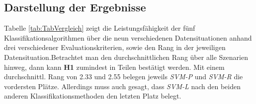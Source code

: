 \documentclass[
]{article}
\begin{document}
\subsection{Darstellung der Ergebnisse}

Tabelle \ref{tab:TabVergleich} zeigt die Leistungsfähigkeit der fünf
Klassifikationsalgorithmen über die neun verschiedenen Datensituationen
anhand drei verschiedener Evaluationskriterien, sowie den Rang in der
jeweiligen Datensituation.\newline Betrachtet man den durchschnittlichen
Rang über alle Szenarien hinweg, dann kann \textbf{H1} zumindest in
Teilen bestätigt werden. Mit einem durchschnittl. Rang von 2.33 und 2.55
belegen jeweils \textit{SVM-P} und \textit{SVM-R} die vordersten Plätze.
Allerdings muss auch gesagt, dass \textit{SVM-L} nach den beiden anderen
Klassifikationsmethoden den letzten Platz belegt. \afterpage{
\clearpage
\begin{landscape}


\end{landscape}}
\end{document}
